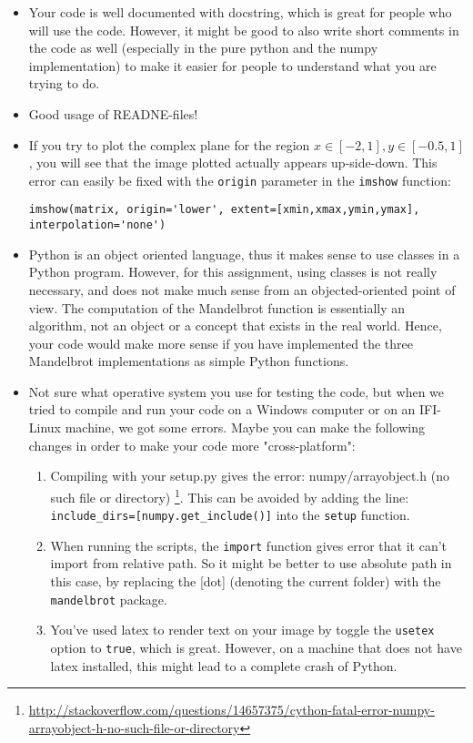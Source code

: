 \documentclass[a4paper]{article}
\begin{document}
\begin{itemize}
  \item Your code is well documented with docstring, which is great for people who will use the code. However, it might be good to also write short comments in the code as well (especially in the pure python and the numpy implementation) to make it easier for people to understand what you are trying to do. 
  
  \item Good usage of READNE-files!
  
  \item If you try to plot the complex plane for the region $x\in[-2,1], y\in[-0.5,1]$, you will see that the image plotted actually appears up-side-down. This error can easily be fixed with the \texttt{origin} parameter in the \texttt{imshow} function:\newline
  \begin{verbatim}
imshow(matrix, origin='lower', extent=[xmin,xmax,ymin,ymax], interpolation='none')
  \end{verbatim}
  
  \item Python is an object oriented language, thus it makes sense to use classes in a Python program. However, for this assignment, using classes is not really necessary, and does not make much sense from an objected-oriented point of view. The computation of the Mandelbrot function is essentially an algorithm, not an object or a concept that exists in the real world. Hence, your code would make more sense if you have implemented the three Mandelbrot implementations as simple Python functions.
  
  \item Not sure what operative system you use for testing the code, but when we tried to compile and run your code on a Windows computer or on an IFI-Linux machine, we got some errors. Maybe you can make the following changes in order to make your code more "cross-platform":
  \begin{enumerate}
    \item Compiling with your setup.py gives the error: numpy/arrayobject.h (no such file or directory) \footnote{\url{http://stackoverflow.com/questions/14657375/cython-fatal-error-numpy-arrayobject-h-no-such-file-or-directory}}. This can be avoided by adding the line: \texttt{include_dirs=[numpy.get_include()]} into the \texttt{setup} function.
    \item When running the scripts, the \texttt{import} function gives error that it can't import from relative path. So it might be better to use absolute path in this case, by replacing the [dot] (denoting the current folder) with the \texttt{mandelbrot} package.
    \item You've used latex to render text on your image by toggle the \texttt{usetex} option to \texttt{true}, which is great. However, on a machine that does not have latex installed, this might lead to a complete crash of Python.
  \end{enumerate}
  

\end{itemize}
\end{document}
